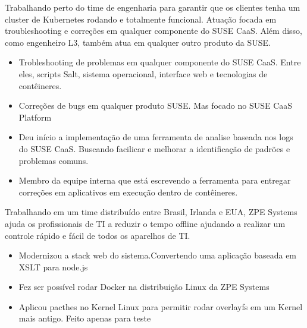 \documentclass[10pt,a4paper]{altacv}
\begin{document}

\begin{fullwidth}
\makecvheader
\end{fullwidth}


Trabalhando perto do time de engenharia para garantir que os clientes tenha um cluster de Kubernetes rodando e totalmente funcional. Atuação focada em troubleshooting e correções em qualquer componente do SUSE CaaS. Além disso, como engenheiro L3, também atua em qualquer outro produto da SUSE.
\begin{itemize}
\item Trobleshooting de problemas em qualquer componente do SUSE CaaS. Entre eles, scripts Salt, sistema operacional, interface web e tecnologias de contêineres.
\item Correções de bugs em qualquer produto SUSE. Mas focado no SUSE CaaS Platform
\item Deu início a implementação de uma ferramenta de analise baseada nos logs do SUSE CaaS. Buscando facilicar e melhorar a identificação de padrões e problemas comuns.
\item Membro da equipe interna que está escrevendo a ferramenta para entregar correções em aplicativos em execução dentro de contêineres.
\end{itemize}

Trabalhando em um time distribuído entre Brasil, Irlanda e EUA, ZPE Systems ajuda os profissionais de TI a reduzir o tempo offline ajudando a realizar um controle rápido e fácil de todos os aparelhos de TI.
\begin{itemize}
\item Modernizou a stack web do sistema.Convertendo uma aplicação baseada em XSLT para node.js 
\item Fez ser possível rodar Docker na distribuição Linux da ZPE Systems
\item Aplicou pacthes no Kernel Linux para permitir rodar overlayfs em um Kernel mais antigo. Feito apenas para teste
\end{itemize}
\end{document}

